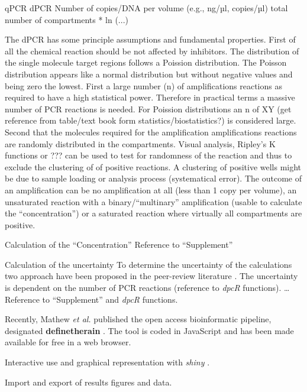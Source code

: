 \documentclass[a4,center,fleqn]{NAR}
\begin{document}
qPCR	dPCR
Number of copies/DNA per volume (e.g., ng/µl, copies/µl)	total number of compartments * ln (...)

The dPCR has some principle assumptions and fundamental properties. First of all 
the chemical reaction should be not affected by inhibitors. The distribution of 
the single molecule target regions follows a Poission distribution. The Poisson 
distribution appears like a normal distribution but without negative values and 
being zero the lowest. First a large number (n) of amplifications reactions as 
required to have a high statistical power. Therefore in practical terms a 
massive number of PCR reactions is needed. For Poission distributions an n of XY 
(get reference from table/text book form statistics/biostatistics?) is 
considered large. Second that the molecules required for the amplification 
amplifications reactions are randomly distributed in the compartments. Visual 
analysis, Ripley's K functions or ??? can be used to test for randomness of the 
reaction and thus to exclude the clustering of of positive reactions. A 
clustering of positive wells might be due to sample loading or analysis process 
(systematical error). The outcome of an amplification can be no amplification at 
all (less than 1 copy per volume), an unsaturated reaction with a 
binary/``multinary'' amplification (usable to calculate the ``concentration'') 
or a saturated reaction where virtually all compartments are positive.

Calculation of the ``Concentration''
Reference to ``Supplement''

Calculation of the uncertainty
To determine the uncertainty of the calculations two approach have been proposed 
in the peer-review literature \cite{dube_mathematical_2008, bhat_single_2009}. The uncertainty is 
dependent on the number of PCR reactions (reference to \textit{\textit{dpcR}} 
functions). … Reference to ``Supplement'' and \textit{dpcR} functions.

Recently, Mathew \textit{et al.} published the open access bioinformatic 
pipeline, designated \textbf{definetherain} \cite{jones_low_2014}. The tool is 
coded in JavaScript and has been made available for free in a web browser.

Interactive use and graphical representation with \textit{shiny} \cite{shiny}.

Import and export of results figures and data.
\end{document}

